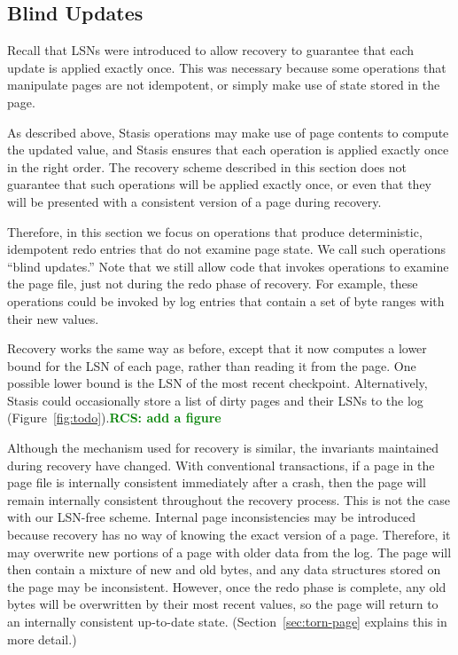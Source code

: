 \documentclass[letterpaper,twocolumn,10pt]{article}
\newcommand{\yad}{Stasis\xspace}
\newcommand{\rcs}[1]{\textcolor{green}{\bf RCS: #1}}
\begin{document}
\subsection{Blind Updates}

Recall that LSNs were introduced to allow recovery to guarantee that
each update is applied exactly once.  This was necessary because some
operations that manipulate pages are not idempotent, or simply make
use of state stored in the page.

As described above, \yad operations may make use of page contents to
compute the updated value, and \yad ensures that each operation is
applied exactly once in the right order. The recovery scheme described
in this section does not guarantee that such operations will be
applied exactly once, or even that they will be presented with a
consistent version of a page during recovery.

Therefore, in this section we focus on operations that produce
deterministic, idempotent redo entries that do not examine page state.
We call such operations ``blind updates.''  Note that we still allow
code that invokes operations to examine the page file, just not during the redo phase of recovery.
For example, these operations could be invoked by log
entries that contain a set of byte ranges with their new values.

Recovery works the same way as before, except that it now computes
a lower bound for the LSN of each page, rather than reading it from the page.
One possible lower bound is the LSN of the most recent checkpoint.  
Alternatively, \yad could occasionally store a list of dirty pages 
and their LSNs to the log (Figure~\ref{fig:todo}).\rcs{add a figure}

Although the mechanism used for recovery is similar, the invariants
maintained during recovery have changed.  With conventional
transactions, if a page in the page file is internally consistent
immediately after a crash, then the page will remain internally
consistent throughout the recovery process.  This is not the case with
our LSN-free scheme.  Internal page inconsistencies may be introduced
because recovery has no way of knowing the exact version of a page.
Therefore, it may overwrite new portions of a page with older data
from the log.  The page will then contain a mixture of new and
old bytes, and any data structures stored on the page may be
inconsistent.  However, once the redo phase is complete, any old bytes
will be overwritten by their most recent values, so the page will
return to an internally consistent up-to-date state.
(Section~\ref{sec:torn-page} explains this in more detail.)
\end{document}
